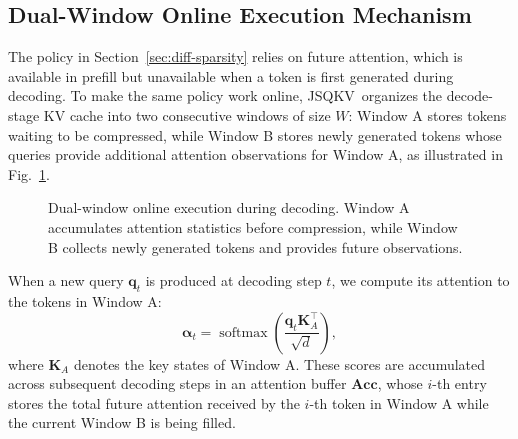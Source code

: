 \documentclass[runningheads]{llncs}
\newcommand{\method}{JSQKV}
\begin{document}
\subsection{Dual-Window Online Execution Mechanism}
\label{sec:dual-window}
The policy in Section~\ref{sec:diff-sparsity} relies on future attention, which is available in prefill but unavailable when a token is first generated during decoding. To make the same policy work online, \method\ organizes the decode-stage KV cache into two consecutive windows of size $W$: Window A stores tokens waiting to be compressed, while Window B stores newly generated tokens whose queries provide additional attention observations for Window A, as illustrated in Fig.~\ref{fig:dual-window}.

\begin{figure}[t]
\centering
{}
\caption{Dual-window online execution during decoding. Window A accumulates attention statistics before compression, while Window B collects newly generated tokens and provides future observations.}
\label{fig:dual-window}
\end{figure}

When a new query $\mathbf{q}_t$ is produced at decoding step $t$, we compute its attention to the tokens in Window A:
\begin{equation}
\boldsymbol{\alpha}_t =
\operatorname{softmax}\!\left(
\frac{\mathbf{q}_t \mathbf{K}_A^\top}{\sqrt{d}}
\right),
\end{equation}
where $\mathbf{K}_A$ denotes the key states of Window A. These scores are accumulated across subsequent decoding steps in an attention buffer $\mathbf{Acc}$, whose $i$-th entry stores the total future attention received by the $i$-th token in Window A while the current Window B is being filled.
\end{document}
